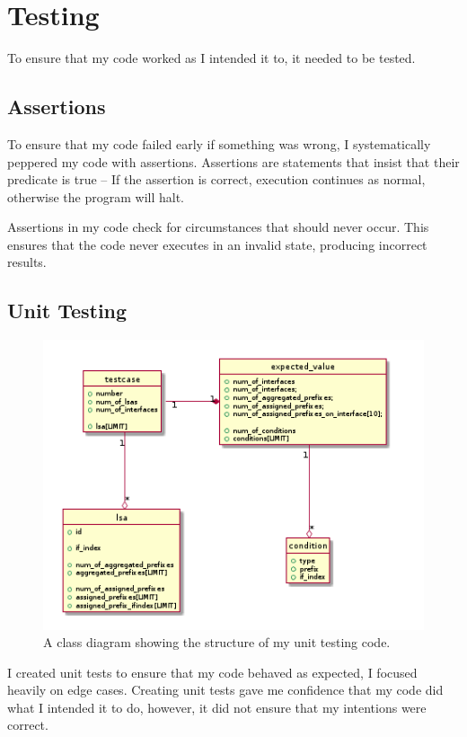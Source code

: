 \documentclass[12pt,a4paper,twoside]{report}
\begin{document}
\chapter{Testing}
To ensure that my code worked as I intended it to, it needed to be tested. 

\section{Assertions}
To ensure that my code failed early if something was wrong, I systematically
peppered my code with assertions. Assertions are statements that insist that
their predicate is true -- If the assertion is correct, execution continues as
normal, otherwise the program will halt.

Assertions in my code check for circumstances that should never occur. This
ensures that the code never executes in an invalid state, producing incorrect
results. 

\section{Unit Testing}
\begin{figure}
\begin{center}
	\includegraphics[width=\linewidth]{../Diagrams/Testing/testcase.png}
	\caption{A class diagram showing the structure of my unit testing code.}
	\label{fig:testcase}
\end{center}
\end{figure}
I created unit tests to ensure that my code behaved as expected, I focused
heavily on edge cases. Creating unit tests gave me confidence that my code did
what I intended it to do, however, it did not ensure that my intentions were
correct.
\end{document}
